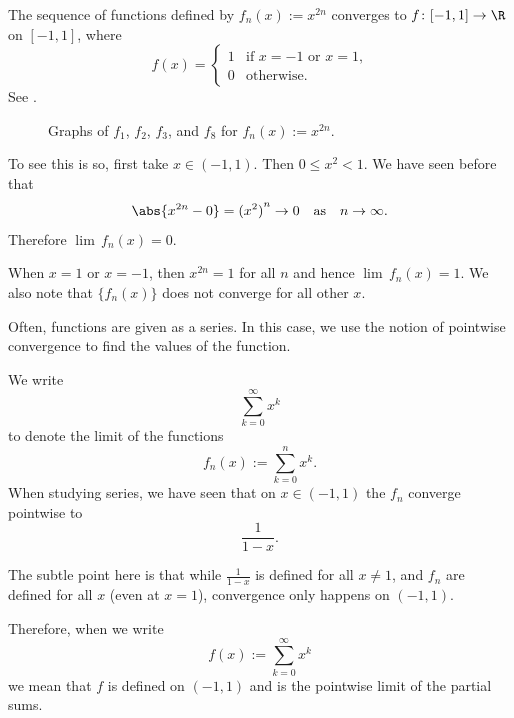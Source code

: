\documentclass[12pt]{book}
\begin{document}
\begin{example}
The sequence of functions defined by $f_n(x) := x^{2n}$ converges to $f \colon [-1,1] \to
\R$ on $[-1,1]$, where
\begin{equation*}
f(x) =
\begin{cases}
1 & \text{if $x=-1$ or $x=1$,} \\
0 & \text{otherwise.}
\end{cases}
\end{equation*}
See .

\begin{figure}[h!t]
\begin{center}

\caption{Graphs of $f_1$, $f_2$, $f_3$, and $f_8$ for $f_n(x) :=
x^{2n}$.\label{x2nfig}}
\end{center}
\end{figure}

To see this is so, first take $x \in (-1,1)$.
Then 
$0 \leq x^2 < 1$.
We have seen before that
\begin{equation*}
\abs{x^{2n} - 0} = {(x^2)}^n \to 0 \quad \text{as} \quad n \to \infty .
\end{equation*}
Therefore $\lim\,f_n(x) = 0$.

When $x = 1$ or $x=-1$, then $x^{2n} = 1$ for all $n$ and hence
$\lim\,f_n(x) = 1$.
We also note that $\{ f_n(x) \}$ does not converge for all other $x$.
\end{example}

Often, functions are given as a series.
In this case, we use
the notion of pointwise convergence to find the values of the function.

\begin{example}
We write
\begin{equation*}
\sum_{k=0}^\infty x^k
\end{equation*}
to denote the limit of the functions
\begin{equation*}
f_n(x) := \sum_{k=0}^n x^k .
\end{equation*}
When studying series, 
we have seen that on $x \in (-1,1)$ the $f_n$ converge pointwise to
\begin{equation*}
\frac{1}{1-x} .
\end{equation*}

The subtle point here is that while
$\frac{1}{1-x}$ is defined for all $x \not=1$, and $f_n$ are 
defined for all $x$ (even at $x=1$), convergence only happens on $(-1,1)$.

Therefore, when we write
\begin{equation*}
f(x) := \sum_{k=0}^\infty x^k
\end{equation*}
we mean that $f$ is defined on $(-1,1)$ and is the pointwise limit
of the partial sums.
\end{example}
\end{document}

